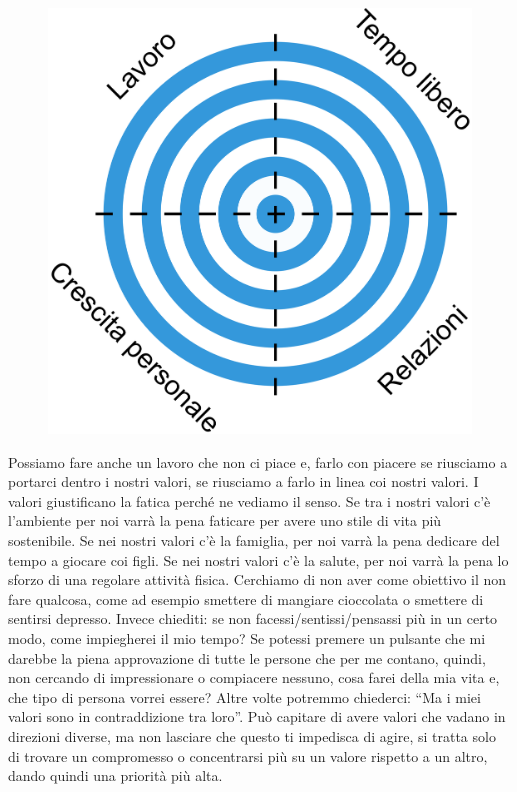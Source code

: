 \documentclass[12pt]{book} %
\begin{document}
\needspace{4cm}
\begin{figure}
  \centering
  \includegraphics[width=0.95\linewidth]{images/Libro-img014.png}
\end{figure}

Possiamo fare anche un lavoro che non ci piace e, farlo con piacere se riusciamo a portarci dentro i nostri valori, se
riusciamo a farlo in linea coi nostri valori. I valori giustificano la fatica perché ne vediamo il senso. Se tra i
nostri valori c'è l'ambiente per noi varrà la pena faticare per avere uno
stile di vita più sostenibile. Se nei nostri valori c'è la famiglia, per noi varrà la pena
dedicare del tempo a giocare coi figli. Se nei nostri valori c'è la salute, per noi varrà la pena
lo sforzo di una regolare attività fisica. Cerchiamo di non aver come obiettivo il non fare qualcosa, come ad esempio smettere di mangiare cioccolata o smettere di sentirsi
depresso. Invece chiediti: se non facessi/sentissi/pensassi più in un certo modo, come impiegherei il mio tempo? Se potessi premere un pulsante che mi darebbe la piena approvazione di
tutte le persone che per me contano, quindi, non cercando di impressionare o compiacere nessuno, cosa farei della
mia vita e, che tipo di persona vorrei essere? Altre volte potremmo chiederci: “Ma i miei valori sono in
contraddizione tra loro”. Può capitare di avere valori che vadano in direzioni diverse, ma non lasciare che questo ti
impedisca di agire, si tratta solo di trovare un compromesso o concentrarsi più su un valore rispetto a un altro, dando
quindi una priorità più alta.
\end{document}
